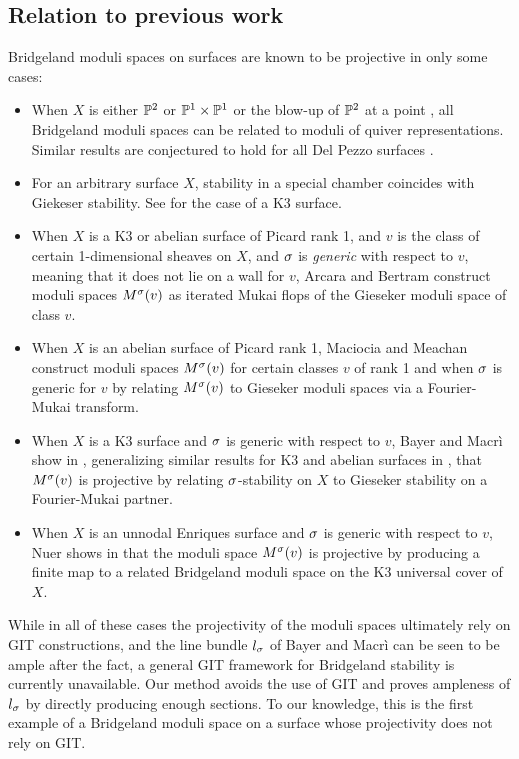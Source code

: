 \subsection*{Relation to previous work}
Bridgeland moduli spaces on surfaces are known to be projective in only some cases:
\begin{itemize}
    \item When $X$ is either $\mathbb{P}^2$ \cite{ABCH} or $\mathbb{P}^1 \times \mathbb{P}^1$ or the blow-up of $\mathbb{P}^2$ at a point \cite{AM}, all Bridgeland moduli spaces can be related to moduli of quiver representations. Similar results are conjectured to hold for all Del Pezzo surfaces \cite{AM}.
    
    \item For an arbitrary surface $X$, stability in a special chamber coincides with Giekeser stability. See \cite{bridgelandK3} for the case of a K3 surface.
    
    \item When $X$ is a K3 or abelian surface of Picard rank 1, and $v$ is the class of certain 1-dimensional sheaves on $X$, and $\sigma$ is \textit{generic} with respect to $v$, meaning that it does not lie on a wall for $v$, Arcara and Bertram \cite{ABL13} construct moduli spaces $M^\sigma(v)$ as iterated Mukai flops of the Gieseker moduli space of class $v$.
    
    \item When $X$ is an abelian surface of Picard rank 1, Maciocia and Meachan \cite{MM} construct moduli spaces $M^\sigma(v)$ for certain classes $v$ of rank 1 and when $\sigma$ is generic for $v$ by relating $M^\sigma(v)$ to Gieseker moduli spaces via a Fourier-Mukai transform.
    
    \item When $X$ is a K3 surface and $\sigma$ is generic with respect to $v$, Bayer and Macr\`i show in \cite{BM}, generalizing similar results for K3 and abelian surfaces in \cite{mmy}, that $M^\sigma(v)$ is projective by relating $\sigma$-stability on $X$ to Gieseker stability on a Fourier-Mukai partner.
    
    \item When $X$ is an unnodal Enriques surface and $\sigma$ is generic with respect to $v$, Nuer shows in \cite{nuer} that the moduli space $M^\sigma(v)$ is projective by producing a finite map to a related Bridgeland moduli space on the K3 universal cover of $X$.
    
\end{itemize} 
While in all of these cases the projectivity of the moduli spaces ultimately rely on GIT constructions, and the line bundle $l_\sigma$ of Bayer and Macr\`i can be seen to be ample after the fact, a general GIT framework for Bridgeland stability is currently unavailable. Our method avoids the use of GIT and proves ampleness of $l_\sigma$ by directly producing enough sections. To our knowledge, this is the first example of a Bridgeland moduli space on a surface whose projectivity does not rely on GIT.


